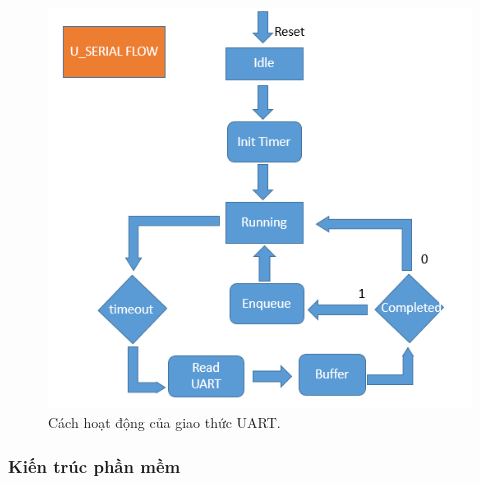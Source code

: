 \documentclass[a4paper,12pt,oneside]{article}
\begin{document}
\begin{itemize}
\begin{itemize}
\begin{itemize}
		  	\begin{center}
			\begin{figure}[h!]
			\begin{center}
			\includegraphics[scale=.6]{hinh/uart_flow.PNG}
			\end{center}
			\caption{Cách hoạt động của giao thức UART.}
			\end{figure}
			\end{center}
					  	
		  	
		  \end{itemize}
		\end{itemize}
	\end{itemize}

\newpage
\subsubsection{Kiến trúc phần mềm}
\end{document}
